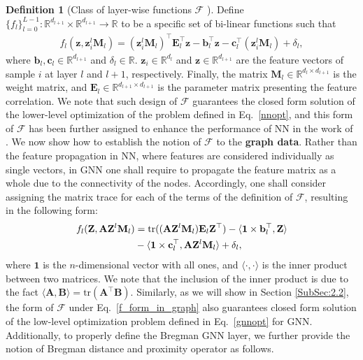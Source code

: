 \documentclass{article}
\begin{document}
\noindent \textbf{Definition 1} (Class of layer-wise functions $\mathcal{F}$ \cite{frecon2022bregman}). 
Define $\{f_l\}^{L-1}_{l=0}: \mathbb{R}^{d_{l+1}}\times \mathbb{R}^{d_{l+1}} \rightarrow \mathbb{R}$ to be a specific set of bi-linear functions such that
\begin{align}\label{initial_defn_f}
    f_l(\mathbf z,\mathbf z_i^l \mathbf M_l) = (\mathbf z_i^{l}\mathbf M_l)^\top \mathbf E_l^\top \mathbf z - \! \mathbf b_l^\top\mathbf z - \! \mathbf c_l^\top(\mathbf z_i^l\mathbf M_l) + {\delta}_l ,
\end{align}
where $\mathbf b_l, \mathbf c_l \in \mathbb{R}^{d_{l+1}}$ and ${\delta}_l\in \mathbb{R}$. $\mathbf{z}_i \in \mathbb{R}^{d_{l}}$ and $\mathbf{z} \in \mathbb{R}^{d_{l+1}}$ are the feature vectors of sample $i$ at layer $l$ and $l+1$, respectively. Finally, the matrix $\mathbf M_l \in \mathbb R^{d_l\times d_{l+1}}$ is the weight matrix, and $\mathbf{E}_l \in \mathbb{R}^{d_{l+1}\times d_{l+1}} $ is the parameter matrix presenting the feature correlation. We note that such design of $\mathcal F$ guarantees the closed form solution of the lower-level optimization of the problem defined in Eq.~\eqref{nnopt}, and this form of $\mathcal F$ has been further assigned to enhance the performance of NN in the work of \cite{frecon2022bregman}. We now show how to establish the notion of $\mathcal F$ to the \textbf{graph data}. Rather than the feature propagation in NN, where features are considered individually as single vectors, in GNN one shall require to propagate the feature matrix as a whole due to the connectivity of the nodes. Accordingly, one shall consider assigning the matrix trace for each of the terms of the definition of $\mathcal F$, resulting in the following form: 
\begin{align}\label{f_form_in_graph}
f_l(\mathbf Z, \mathbf A \mathbf Z^l\mathbf M_l) &= \text{tr}((\mathbf A \mathbf Z^l \mathbf M_l)\mathbf E_l \mathbf Z^\top) - \langle \mathbf{1} \times \mathbf b_l^\top,\mathbf Z \rangle \notag \\ &- \langle \mathbf{1} \times \mathbf c_l^\top, \mathbf A \mathbf Z^l \mathbf M_l \rangle + {\delta}_l ,
\end{align}
where $\mathbf{1}$ is the $n$-dimensional vector with all ones, and $\langle \cdot,\cdot \rangle$ is the inner product between two matrices. We note that the inclusion of the inner product is due to the fact $\langle \mathbf A, \mathbf B\rangle = \mathrm{tr}(\mathbf A^\top \mathbf B)$.  Similarly, as we will show in Section \ref{SubSec:2.2}, the form of $\mathcal F$ under Eq.~\eqref{f_form_in_graph} also guarantees closed form solution of the low-level optimization problem defined in Eq.~\eqref{gnnopt} for GNN. Additionally, to properly define the Bregman GNN layer, we further provide the notion of Bregman distance and proximity operator as follows.
\end{document}
